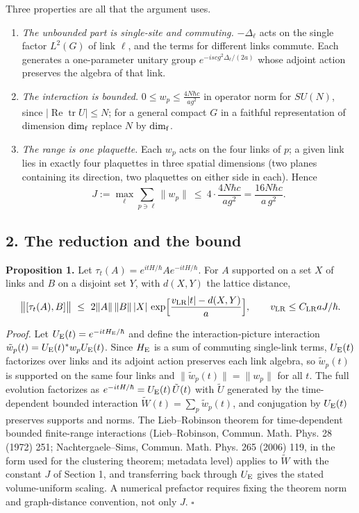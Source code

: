 \documentclass[11pt,a4paper]{article}
\newcommand{\tightlist}{\setlength{\itemsep}{0pt}\setlength{\parskip}{0pt}}
\begin{document}
Three properties are all that the argument uses.

\begin{enumerate}
\def\labelenumi{\arabic{enumi}.}
\tightlist
\item
  \emph{The unbounded part is single-site and commuting.}
  \(-\Delta_\ell\) acts on the single factor \(L^2(G)\) of link
  \(\ell\), and the terms for different links commute. Each generates a
  one-parameter unitary group \(e^{-isc g^2\Delta_\ell/(2a)}\) whose
  adjoint action preserves the algebra of that link.
\item
  \emph{The interaction is bounded.}
  \(0\le w_p\le\frac{4N\hbar c}{a g^2}\) in operator norm for \(SU(N)\),
  since \(|\operatorname{Re}\operatorname{tr}U|\le N\); for a general
  compact \(G\) in a faithful representation of dimension
  \(\dim_{\rm f}\) replace \(N\) by \(\dim_{\rm f}\).
\item
  \emph{The range is one plaquette.} Each \(w_p\) acts on the four links
  of \(p\); a given link lies in exactly four plaquettes in three
  spatial dimensions (two planes containing its direction, two
  plaquettes on either side in each). Hence
  \[J:=\max_{\ell}\sum_{p\ni\ell}\|w_p\|\ \le\ 4\cdot\frac{4N\hbar c}{a g^2}
  =\frac{16N\hbar c}{a\,g^2}.\]
\end{enumerate}

\hypertarget{the-reduction-and-the-bound}{%
\subsection{2. The reduction and the
bound}\label{the-reduction-and-the-bound}}

\textbf{Proposition 1.} Let \(\tau_t(A)=e^{itH/\hbar}Ae^{-itH/\hbar}\).
For \(A\) supported on a set \(X\) of links and \(B\) on a disjoint set
\(Y\), with \(d(X,Y)\) the lattice distance,
\[\big\|[\tau_t(A),B]\big\|\ \le\ 2\|A\|\,\|B\|\,|X|\,
\exp\!\Big[\frac{v_{\rm LR}|t|-d(X,Y)}{a}\Big],\qquad v_{\rm LR}\le C_{\rm LR}aJ/\hbar.\]

\emph{Proof.} Let \(U_{\rm E}(t)=e^{-itH_{\rm E}/\hbar}\) and define the
interaction-picture interaction
\(\tilde w_p(t)=U_{\rm E}(t)^*w_pU_{\rm E}(t)\). Since \(H_{\rm E}\) is
a sum of commuting single-link terms, \(U_{\rm E}(t)\) factorizes over
links and its adjoint action preserves each link algebra, so
\(\tilde w_p(t)\) is supported on the same four links and
\(\|\tilde w_p(t)\|=\|w_p\|\) for all \(t\). The full evolution
factorizes as \(e^{-itH/\hbar}=U_{\rm E}(t)\,\tilde U(t)\) with
\(\tilde U\) generated by the time-dependent bounded interaction
\(\tilde W(t)=\sum_p\tilde w_p(t)\), and conjugation by \(U_{\rm E}(t)\)
preserves supports and norms. The Lieb--Robinson theorem for
time-dependent bounded finite-range interactions (Lieb--Robinson,
Commun. Math. Phys. 28 (1972) 251; Nachtergaele--Sims, Commun. Math.
Phys. 265 (2006) 119, in the form used for the clustering theorem;
metadata level) applies to \(\tilde W\) with the constant \(J\) of
Section 1, and transferring back through \(U_{\rm E}\) gives the stated
volume-uniform scaling. A numerical prefactor requires fixing the
theorem norm and graph-distance convention, not only \(J\). \(\square\)
\end{document}
